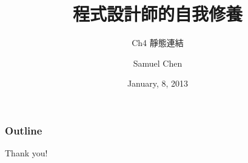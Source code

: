 \documentclass{beamer}
\begin{document}
\begin{CJK*}{UTF8}{nkai}

\title{程式設計師的自我修養}
\subtitle{Ch4 靜態連結}
\author[Samuel]{Samuel Chen}
\date{January, 8, 2013}

\frame{\titlepage}

\begin{frame}
    \frametitle{Outline}
    \tableofcontents
\end{frame}



{
    \begin{frame}
    \begin{center}
        \Huge Thank you!
    \end{center}
    \end{frame}
}

\end{CJK*}
\end{document}
